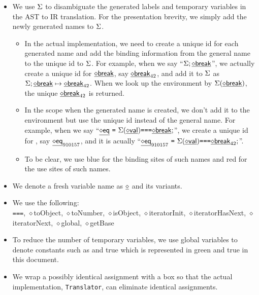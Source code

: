\begin{itemize}
\item We use $\Sigma$ to disambiguate the generated labels and temporary variables in the AST to IR translation.
For the presentation brevity, we simply add the newly generated names to $\Sigma$.
\begin{itemize}
\item In the actual implementation, we need to create a unique id for each generated name and
add the binding information from the general name to the unique id to $\Sigma$.
For example, when we say ``$\Sigma; \underline{\sf \diamond{break}}$'',
we actually create a unique id for $\underline{\sf \diamond{break}}$, say $\underline{\sf \diamond{break}}_{42}$, and add it to $\Sigma$ as $\Sigma; \underline{\sf \diamond{break}} \mapsto \underline{\sf \diamond{break}}_{42}$.
When we look up the environment by $\Sigma(\underline{\sf \diamond{break}})$, the unique $\underline{\sf \diamond{break}}_{42}$ is returned.
\item In the scope when the generated name is created, we don't add it to the environment but use the unique id instead of the general name.
For example, when we say ``$\newvar{eq}\ \verb+=+\ \env(\newvar{val}) \verb+===+ \newvar{break};$'',
we create a unique id for , say $\underline{\sf \diamond{eq}}_{910157}$, and it is acually
``$\newvar{eq}_{910157}\ \verb+=+\ \env(\newvar{val}) \verb+===+ \newvar{break}_{42};$''.
\item To be clear, we use blue for the binding sites of such names and red for the use sites of such names.
\end{itemize}
\item We denote a fresh variable name as $\underline{\sf \diamond{}}$ and its variants.
\item We use the following:\\
\verb+===+, {\sf \ensuremath{\diamond}toObject}, {\sf \ensuremath{\diamond}toNumber}, {\sf \ensuremath{\diamond}isObject},
{\sf \ensuremath{\diamond}iteratorInit}, {\sf \ensuremath{\diamond}iteratorHasNext}, {\sf \ensuremath{\diamond}iteratorNext},
{\sf \ensuremath{\diamond}global}, {\sf \ensuremath{\diamond}getBase}
\item To reduce the number of temporary variables, we use global variables to denote constants such as {} and
{\sf true} which is represented in green {\ingreen{}} and  {\ingreen\sf true} in this document.
\item We wrap a possibly identical assignment with a box so that the actual implementation, {\tt Translator}, can eliminate identical assignments.
\end{itemize}


